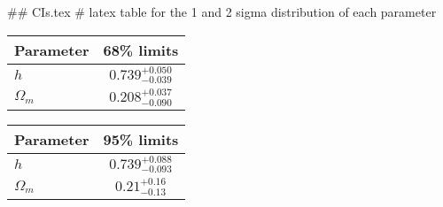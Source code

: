 ## CIs.tex
# latex table for the 1 and 2 sigma distribution of each parameter

\begin{tabular} { l  c}
 Parameter &  68\% limits\\
\hline
{\boldmath$h              $} & $0.739^{+0.050}_{-0.039}   $\\
{\boldmath$\Omega_m       $} & $0.208^{+0.037}_{-0.090}   $\\
\hline
\end{tabular}

\begin{tabular} { l  c}
 Parameter &  95\% limits\\
\hline
{\boldmath$h              $} & $0.739^{+0.088}_{-0.093}   $\\
{\boldmath$\Omega_m       $} & $0.21^{+0.16}_{-0.13}      $\\
\hline
\end{tabular}
